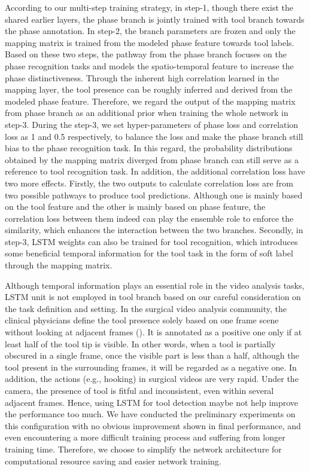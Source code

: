 \documentclass{elsarticle}
\begin{document}
According to our multi-step training strategy, in step-1, though there exist the shared earlier layers, the phase branch is jointly trained with tool branch towards the phase annotation. In step-2, the branch parameters are frozen and only the mapping matrix is trained from the modeled phase feature towards tool labels. Based on these two steps, the pathway from the phase branch focuses on the phase recognition tasks and models the spatio-temporal feature to increase the phase distinctiveness. Through the inherent high correlation learned in the mapping layer, the tool presence can be roughly inferred and derived from the modeled phase feature. Therefore, we regard the output of the mapping matrix from phase branch as an additional prior when training the whole network in step-3. During the step-3, we set hyper-parameters of phase loss and correlation loss as 1 and 0.5 respectively, to balance the loss and make the phase branch still bias to the phase recognition task. In this regard, the probability distributions obtained by the mapping matrix diverged from phase branch can still serve as a reference to tool recognition task.
In addition, the additional correlation loss have two more effects. Firstly, the two outputs to calculate correlation loss are from two possible pathways to produce tool predictions. Although one is mainly based on the tool feature and the other is mainly based on phase feature, the correlation loss between them indeed can play the ensemble role to enforce the similarity, which enhances the interaction between the two branches. Secondly, in step-3, LSTM weights can also be trained for tool recognition, which introduces some beneficial temporal information for the tool task in the form of soft label through the mapping matrix. 



Although temporal information plays an essential role in the video analysis tasks,
LSTM unit is not employed in tool branch based on our careful consideration on the task definition and setting.
In the surgical video analysis community, the clinical physicians define the tool presence solely based on one frame scene without looking at adjacent frames (\cite{twinanda2017endonet}).
It is annotated as a positive one only if at least half of the tool tip is visible. 
In other words, when a tool is partially obscured in a single frame, once the visible part is less than a half, although the tool present in the surrounding frames, it will be regarded as a negative one.
In addition, the actions (e.g., hooking) in surgical videos are very rapid. Under the camera, the presence of tool is fitful and inconsistent, even within several adjacent frames. Hence, using LSTM for tool detection maybe not help improve the performance too much. 
We have conducted the preliminary experiments on this configuration with no obvious improvement shown in final performance, and even encountering a more difficult training process and suffering from longer training time.
Therefore, we choose to simplify the network architecture for computational resource saving and easier network training.
\end{document}
